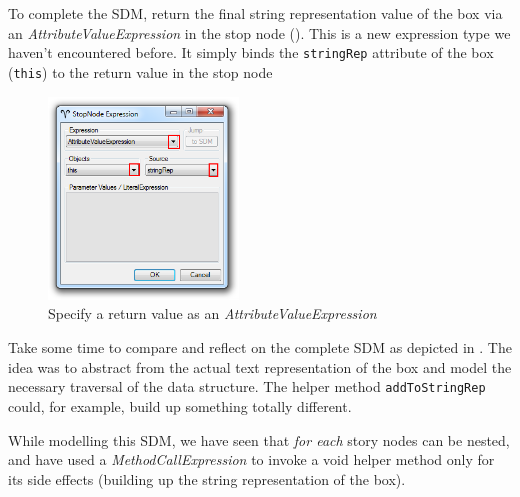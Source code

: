 \begin{stepbystep}
\item To complete the SDM, return the final string representation value of the box via an \emph{AttributeValueExpression} in
the stop node (). This is a new expression type we haven't encountered before. It simply
binds the \texttt{stringRep} attribute of the box (\texttt{this}) to the return value in the stop node


\begin{figure}[htbp]
\begin{center}
  \includegraphics[width=0.45\textwidth]{../../org.moflon.doc.handbook.03_storyDiagrams/10_stringRep/visSRImages/ea_returnAttributeStopNode}
  \caption{Specify a return value as an \emph{AttributeValueExpression}}
  \label{ea:toStringStopNode}
\end{center}
\end{figure}

\vspace{0.5cm}

\item Take some time to compare and reflect on the complete SDM as depicted in .  The idea was to
abstract from the actual text representation of the box and model the necessary traversal of the data structure. The helper method \texttt{addToStringRep}
could, for example, build up something totally different.

\vspace{0.5cm}

\item While modelling this SDM, we have seen that \emph{for each} story nodes can be nested, and have used a \emph{MethodCallExpression}
to invoke a void helper method only for its side effects (building up the string representation of the box).

\vspace{0.5cm}


\end{stepbystep}
